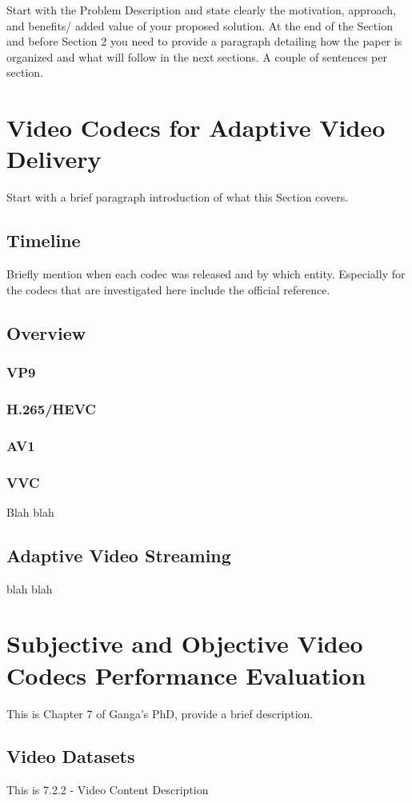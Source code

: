 \documentclass{ieeeaccess}
\begin{document}
Start with the Problem Description and state clearly the motivation, approach, and benefits/ added value of your proposed solution. 
At the end of the Section and before Section 2 you need to provide a paragraph detailing how the paper is organized and what will follow in the next sections. A couple of sentences per section.


\section{Video Codecs for Adaptive Video Delivery}
Start with a brief paragraph introduction of what this Section covers. 

\subsection{Timeline}
Briefly mention when each codec was released and by which entity. Especially for the codecs that are investigated here include the official reference.

\subsection{Overview}
\subsubsection{VP9}
\subsubsection{H.265/HEVC}
\subsubsection{AV1}
\subsubsection{VVC}
Blah blah

\subsection{Adaptive Video Streaming}
blah blah

\section{Subjective and Objective Video Codecs Performance Evaluation}
This is Chapter 7 of Ganga's PhD, provide a brief description.
\subsection{Video Datasets}
This is 7.2.2 - Video Content Description
\end{document}
